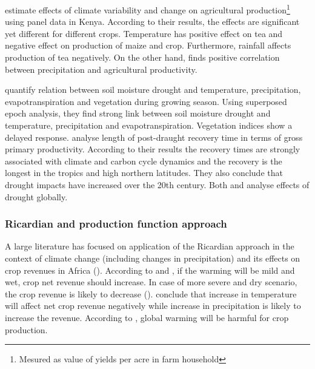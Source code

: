 \documentclass[a4paper,12pt]{article}
\begin{document}
\cite{Ochieng2016} estimate effects of climate variability and change on agricultural production\footnote{Mesured as value of yields per acre in farm household} using panel data in Kenya. According to their results, the effects are significant yet different for different crops. Temperature has positive effect on tea and negative effect on production of maize and crop. Furthermore, rainfall affects production of tea negatively. On the other hand, \cite{Vrieling2011} finds positive correlation between precipitation and agricultural productivity.








 \cite{nicolai2017} quantify relation between soil moisture drought and temperature, precipitation, evapotranspiration and vegetation during growing season. Using superposed epoch analysis, they find strong link between soil moisture drought and temperature, precipitation and evapotranspiration. Vegetation indices show a delayed response. \cite{schwalm2017} analyse length of post-draught recovery time in terms of gross primary productivity. According to their results the recovery times are strongly associated with climate and carbon cycle dynamics and the recovery is the longest in the tropics and high northern latitudes. They also conclude that drought impacts have increased over the 20th century. Both \cite{nicolai2017} and \cite{schwalm2017} analyse effects of drought globally.
 

\subsubsection*{Ricardian and production function approach}

A large literature has focused on application of the Ricardian approach in the context of climate change (including changes in precipitation) and its effects on crop revenues in Africa (\citealp{RicardianBello,kabubo2007, KMendelsohn2008, SeoMendelsohn}). According to \cite{SeoMendelsohn} and \cite{KMendelsohn2008}, if the warming will be mild and wet, crop net revenue should increase. In case of more severe and dry scenario, the crop revenue is likely to decrease (\citealp{KMendelsohn2008, SeoMendelsohn}).  \cite{RicardianBello} conclude that increase in temperature will affect net crop revenue negatively while increase in precipitation is likely to increase the revenue. According to \citet{kabubo2007}, global warming will be harmful for crop production.
\end{document}
